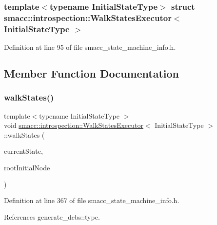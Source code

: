 \subsubsection*{template$<$typename Initial\+State\+Type$>$\newline
struct smacc\+::introspection\+::\+Walk\+States\+Executor$<$ Initial\+State\+Type $>$}



Definition at line 95 of file smacc\+\_\+state\+\_\+machine\+\_\+info.\+h.



\subsection{Member Function Documentation}
\mbox{\label{structsmacc_1_1introspection_1_1WalkStatesExecutor_a21848ccc6e7a7ddee0ccfff97e550ec6}} 
\subsubsection{\texorpdfstring{walk\+States()}{walkStates()}}
{\footnotesize\ttfamily template$<$typename Initial\+State\+Type $>$ \\
void \hyperlink{structsmacc_1_1introspection_1_1WalkStatesExecutor}{smacc\+::introspection\+::\+Walk\+States\+Executor}$<$ Initial\+State\+Type $>$\+::walk\+States (\begin{DoxyParamCaption}\item[{std\+::shared\+\_\+ptr$<$ \hyperlink{classsmacc_1_1introspection_1_1SmaccStateInfo}{Smacc\+State\+Info} $>$ \&}]{current\+State,  }\item[{\hyperlink{classbool}{bool}}]{root\+Initial\+Node }\end{DoxyParamCaption})\hspace{0.3cm}{\ttfamily [static]}}



Definition at line 367 of file smacc\+\_\+state\+\_\+machine\+\_\+info.\+h.



References generate\+\_\+debs\+::type.



